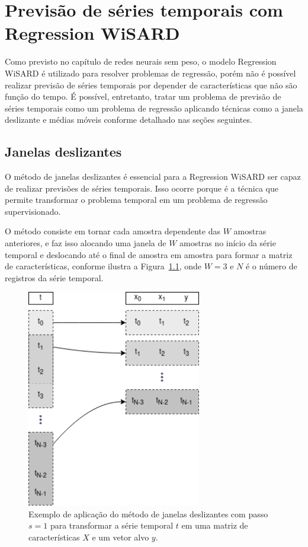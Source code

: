 \chapter{Previsão de séries temporais com Regression WiSARD}
Como previsto no capítulo de redes neurais sem peso, o modelo Regression WiSARD é utilizado para resolver problemas de regressão, porém não é possível realizar previsão de séries temporais por depender de características que não são função do tempo. É possível, entretanto, tratar um problema de previsão de séries temporais como um problema de regressão aplicando técnicas como a janela deslizante e médias móveis conforme detalhado nas seções seguintes.

\section{Janelas deslizantes} \label{sec:sliding_window}
O método de janelas deslizantes é essencial para a Regression WiSARD ser capaz de realizar previsões de séries temporais. Isso ocorre porque é a técnica que permite transformar o problema temporal em um problema de regressão supervisionado.

O método consiste em tornar cada amostra dependente das $W$ amostras anteriores, e faz isso alocando uma janela de $W$ amostras no início da série temporal e deslocando até o final de amostra em amostra para formar a matriz de características, conforme ilustra a Figura~\ref{fig:sliding_window}, onde $W=3$ e $N$ é o número de registros da série temporal.

\begin{figure}[!htp] \label{fig:sliding_window}
    \centering
    \includegraphics[width=3.0in]{img/sliding_window.png}
    \caption{Exemplo de aplicação do método de janelas deslizantes com passo $s=1$  para transformar a série temporal $t$ em uma matriz de características $X$ e um vetor alvo $y$. }
\end{figure}

